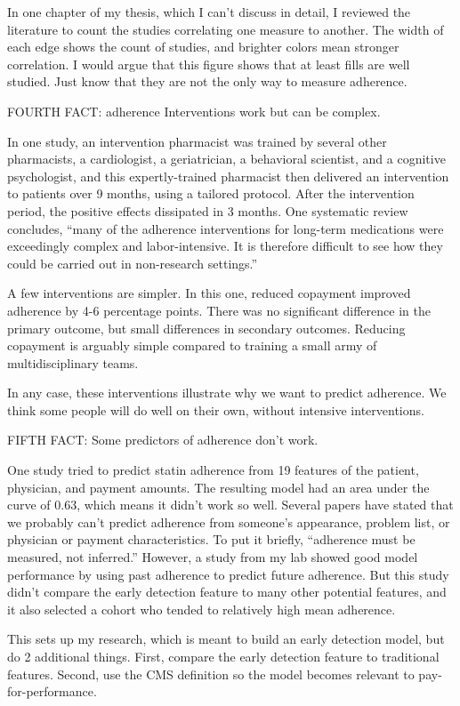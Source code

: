 \documentclass[12pt]{report}
\begin{document}
\begin{large}
In one chapter of my thesis, which I can't discuss in detail, I
reviewed the literature to count the studies correlating one measure
to another. The width of each edge shows the count of studies, and
brighter colors mean stronger correlation. I would argue that this
figure shows that at least fills are well studied. Just know that they
are not the only way to measure adherence.

FOURTH FACT: adherence Interventions work but can be complex.

In one study, an intervention pharmacist was trained by several other
pharmacists, a cardiologist, a geriatrician, a behavioral scientist,
and a cognitive psychologist, and this expertly-trained pharmacist
then delivered an intervention to patients over 9 months, using a
tailored protocol. After the intervention period, the positive effects
dissipated in 3 months. One systematic review concludes, ``many of the
adherence interventions for long-term medications were exceedingly
complex and labor-intensive. It is therefore difficult to see how they
could be carried out in non-research settings.''

A few interventions are simpler. In this one, reduced copayment
improved adherence by 4-6 percentage points. There was no significant
difference in the primary outcome, but small differences in secondary
outcomes. Reducing copayment is arguably simple compared to training a
small army of multidisciplinary teams.

In any case, these interventions illustrate why we want to predict
adherence. We think some people will do well on their own, without
intensive interventions.

FIFTH FACT: Some predictors of adherence don't work.

One study tried to predict statin adherence from 19 features of the
patient, physician, and payment amounts. The resulting model had an
area under the curve of 0.63, which means it didn't work so well.
Several papers have stated that we probably can't predict adherence
from someone's appearance, problem list, or physician or payment
characteristics. To put it briefly, ``adherence must be measured, not
inferred.'' However, a study from my lab showed good model performance
by using past adherence to predict future adherence. But this study
didn't compare the early detection feature to many other potential
features, and it also selected a cohort who tended to relatively high
mean adherence.

This sets up my research, which is meant to build an early detection
model, but do 2 additional things. First, compare the early detection
feature to traditional features. Second, use the CMS definition so the
model becomes relevant to pay-for-performance.


\end{large}
\end{document}
